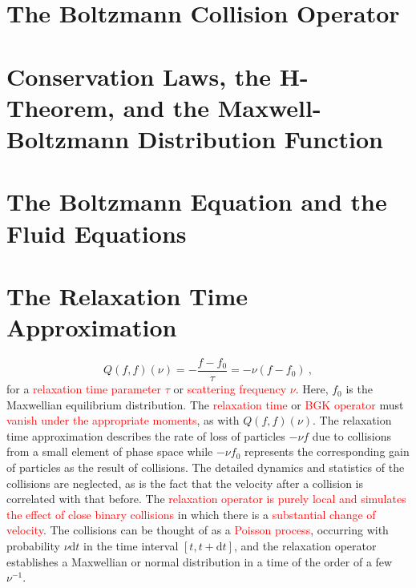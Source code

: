 \documentclass[12pt,a4paper]{article}
\newcommand{\dif}{\mathrm{d}}
\begin{document}
\section{The Boltzmann Collision Operator} 




\section{Conservation Laws, the H-Theorem, and the Maxwell-Boltzmann Distribution Function}



\section{The Boltzmann Equation and the Fluid Equations}




\section{The Relaxation Time Approximation}
\begin{equation}
Q(f, f)(\nu) = -\dfrac{f-f_0}{\tau} = -\nu (f-f_0) ~,
\end{equation}
for a \textcolor{red}{relaxation time parameter $\tau$} or \textcolor{red}{scattering frequency $\nu$}. Here, $f_0$ is the Maxwellian equilibrium distribution. The \textcolor{red}{relaxation time} or \textcolor{red}{BGK operator} must \textcolor{red}{vanish under the appropriate moments}, as with $Q(f, f)(\nu)$. The relaxation time approximation describes the rate of loss of particles $-\nu f$ due to collisions from a small element of phase space while $-\nu f_0$ represents the corresponding gain of particles as the result of collisions. The detailed dynamics and statistics of the collisions are neglected, as is the fact that the velocity after a collision is correlated with that before. The \textcolor{red}{relaxation operator is purely local and simulates the effect of close binary collisions} in which there is a \textcolor{red}{substantial change of velocity}. The collisions can be thought of as a \textcolor{red}{Poisson process}, occurring with probability $\nu \dif t$ in the time interval $[t, t+\dif t]$, and the relaxation operator establishes a Maxwellian or normal distribution in a time of the order of a few $\nu^{-1}$.





\end{document}
